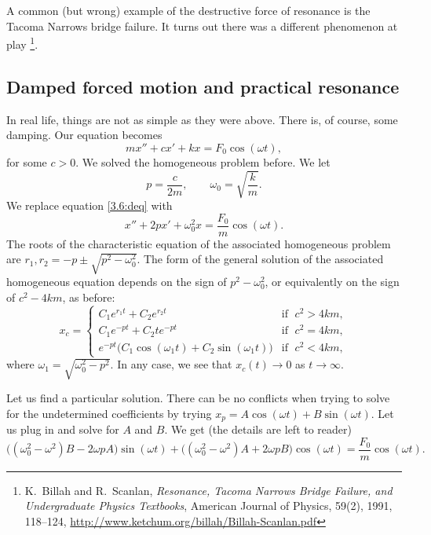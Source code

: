 A common (but wrong) example of the destructive force of resonance is the Tacoma
Narrows bridge failure.  It turns out there was a different
phenomenon at play%
\footnote{K.\ Billah and R.\ Scanlan, \emph{Resonance, Tacoma Narrows
Bridge Failure, and Undergraduate Physics Textbooks}, American Journal of
Physics, 59(2), 1991, 118--124,
\url{http://www.ketchum.org/billah/Billah-Scanlan.pdf}}.

\subsection{Damped forced motion and practical resonance}

In real life, things are not as simple as they were above.  There is,
of course, some damping.  Our equation becomes
\begin{equation} \label{3.6:deq}
mx'' + cx' + kx = F_0 \cos (\omega t) ,
\end{equation}
for some $c > 0$.  We solved the homogeneous problem before.  We let
\begin{equation*}
p = \frac{c}{2m},  \qquad \omega_0 = \sqrt{\frac{k}{m}} .
\end{equation*}
We replace equation \eqref{3.6:deq} with
\begin{equation*}
x'' + 2px' + \omega_0^2x = \frac{F_0}{m} \cos (\omega t) .
\end{equation*}
The roots of the characteristic equation of the associated
homogeneous problem are $r_1,r_2 = -p \pm \sqrt{p^2 - \omega_0^2}$.  The form
of the general solution of the associated homogeneous equation
depends on the sign of $p^2 - \omega_0^2$, or
equivalently on the sign of $c^2 - 4km$, as before:
\begin{equation*}
x_c =
\begin{cases}
C_1 e^{r_1 t} + C_2 e^{r_2 t} & \text{if } \; c^2 > 4km , \\
C_1 e^{-p t} + C_2 t e^{-p t} & \text{if } \; c^2 = 4km , \\
e^{-p t} \bigl( C_1 \cos (\omega_1 t) + C_2 \sin (\omega_1 t) \bigr) &
  \text{if } \; c^2 < 4km ,
\end{cases}
\end{equation*}
where $\omega_1 = \sqrt{\omega_0^2 - p^2}$.  In any case, we see that
$x_c(t) \to 0$ as $t \to \infty$.

\pagebreak[2]
Let us find a particular solution.
There can be no conflicts when trying to solve for the
undetermined coefficients by trying $x_p = A \cos (\omega t)
+ B \sin (\omega t)$.
Let us plug
in and solve for $A$ and $B$.
We get (the  %
details are left to reader)
\begin{equation*}
\bigl((\omega_0^2  - \omega^2)B - 2\omega p A\bigr) \sin (\omega t)
+
\bigl((\omega_0^2  - \omega^2)A + 2\omega p B\bigr) \cos (\omega t)
=
\frac{F_0}{m} \cos (\omega t) .
\end{equation*}

